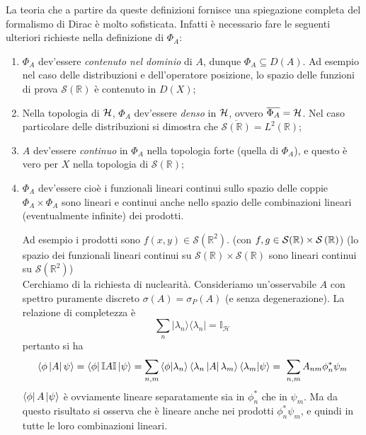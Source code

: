 \documentclass[../../FisicaTeorica.tex]{subfiles}
\begin{document}
La teoria che a partire da queste definizioni fornisce una spiegazione completa del formalismo di Dirac è molto sofisticata. Infatti è necessario fare le seguenti ulteriori richieste nella definizione di $\Phi_A$:
\begin{enumerate}
    \item $\Phi_A$ dev'essere \emph{contenuto nel dominio} di $A$, dunque $\displaystyle \Phi_A\subseteq D\left(A\right)$. Ad esempio nel caso delle distribuzioni e dell'operatore posizione, lo spazio delle funzioni di prova $\mathcal S\left(\mathbb{R}\right)$ è contenuto in $D(X)$;
	\item Nella topologia di $\mathcal{H}$, $\Phi_A$ dev'essere \emph{denso} in $\mathcal{H}$, ovvero $\overline{\Phi_A} = \mathcal{H}$. Nel caso particolare delle distribuzioni si dimostra che $\overline{\mathcal{S}\left(\mathbb{R}\right)} = L^2(\mathbb R)$;
	\item $A$ dev'essere \emph{continuo} in $\Phi_A$ nella topologia forte (quella di $\Phi_A$), e questo è vero per $X$ nella topologia di $\mathcal S\left(\mathbb{R}\right)$;
	\item $\Phi_A$ dev'essere  cioè i funzionali lineari continui sullo spazio delle coppie $\Phi_A\times \Phi_A$ sono lineari e continui anche nello spazio delle combinazioni lineari (eventualmente infinite) dei prodotti.
	
	Ad esempio i prodotti sono $f\left(x,y\right)\in \mathcal S\left(\mathbb{R}^2\right)$. (con $f,g\in \mathcal{S}(\mathbb{R})\times \mathcal{S}\left(\mathbb{R}\right)$)
	(lo spazio dei funzionali lineari continui su $\mathcal{S}\left(\mathbb{R}\right)\times \mathcal{S}\left(\mathbb{R}\right)$ sono lineari continui su $\mathcal{S}(\mathbb{R}^2)$)\\
	
	
	Cerchiamo di  la richiesta di nuclearità. 
	Consideriamo un'osservabile $A$ con spettro puramente discreto $\sigma \left(A\right)=\sigma_P(A)$ (e senza degenerazione). La relazione di completezza è
	\[
	\sum_{n}{|\lambda_n\rangle \langle\lambda_n|}=\mathbb{I}_\mathcal{H}
	\]
	pertanto si ha
	\[
	\left\langle\phi\left|A\right|\psi\right\rangle = \bra\phi\mathbb{I}A\mathbb{I}\ket\psi
	= \sum_{n,m}{\left\langle\phi\middle|\lambda_n\right\rangle\left\langle\lambda_n\left|A\right|\lambda_m\right\rangle\left\langle\lambda_m\middle|\psi\right\rangle}
	= \ \sum_{n,m}{A_{nm}\phi_n^\ast\psi_{m}}
	\]
	$\bra\phi A \ket\psi$ è ovviamente lineare separatamente sia in $\phi_n^\ast$ che in $\psi_m$. Ma da questo risultato si osserva che è lineare anche nei prodotti $\phi_n^\ast\psi_m$, e quindi in tutte le loro combinazioni lineari.
	

\end{enumerate}
\end{document}
